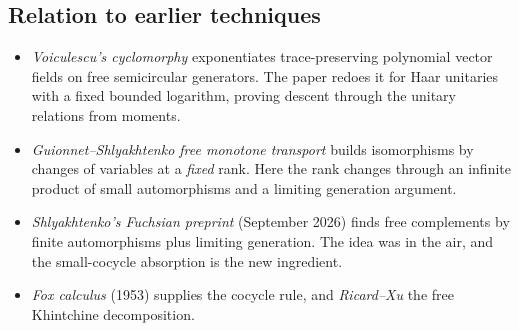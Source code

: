 \subsection{Relation to earlier techniques}
\begin{itemize}[leftmargin=*]
\item \emph{Voiculescu's cyclomorphy} exponentiates trace-preserving polynomial vector fields on free semicircular generators. The paper redoes it for
Haar unitaries with a fixed bounded logarithm, proving descent through the unitary relations from moments.
\item \emph{Guionnet--Shlyakhtenko free monotone transport} builds isomorphisms by changes of variables at a \emph{fixed} rank. Here the rank changes
through an infinite product of small automorphisms and a limiting generation argument.
\item \emph{Shlyakhtenko's Fuchsian preprint} (September 2026) finds free complements by finite automorphisms plus limiting generation. The idea was
in the air, and the small-cocycle absorption is the new ingredient.
\item \emph{Fox calculus} (1953) supplies the cocycle rule, and \emph{Ricard--Xu} the free Khintchine decomposition.
\end{itemize}
